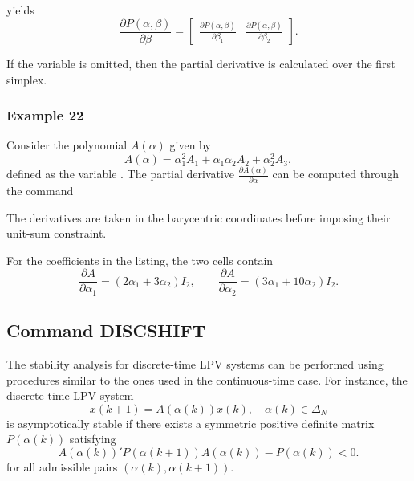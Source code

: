\documentclass[english,11pt]{article}
\theoremstyle{break} \theorembodyfont{\small\rm}
\begin{document}
\noindent yields
\[
 \frac{\partial P(\alpha,\beta)}{\partial \beta} =
 \begin{bmatrix}
    \displaystyle \frac{\partial P(\alpha,\beta)}{\partial \beta_1} & \displaystyle \frac{\partial P(\alpha,\beta)}{\partial \beta_2}
 \end{bmatrix}.
\]

If the variable  is omitted, then the partial derivative is calculated over the first simplex.


\subsubsection*{Example 22}

Consider the polynomial $A(\alpha)$ given by
\[
 A(\alpha) = \alpha_1^2A_1 + \alpha_1\alpha_2A_2 + \alpha_2^2A_3,
\]
defined as the variable .
The partial derivative $\displaystyle\frac{\partial A(\alpha)}{\partial \alpha}$ can be computed through the command
\vspace{0.5cm}%
\noindent\begin{minipage}{\linewidth}
\end{minipage}

The derivatives are taken in the barycentric coordinates before imposing
their unit-sum constraint.

For the coefficients in the listing, the two cells contain
\[
 \frac{\partial A}{\partial\alpha_1}=(2\alpha_1+3\alpha_2)I_2,\qquad
 \frac{\partial A}{\partial\alpha_2}=(3\alpha_1+10\alpha_2)I_2.
\]


\subsection*{Command DISCSHIFT}

The stability analysis for discrete-time LPV systems can be performed using procedures similar to the ones used in the
continuous-time case. For instance, the discrete-time LPV system
\[
 x(k+1) = A(\alpha(k))x(k), \quad \alpha(k) \in \Delta_N
\]
is asymptotically stable if there exists a symmetric positive definite
matrix $P(\alpha(k))$ satisfying
\[
 A(\alpha(k))'P(\alpha(k+1))A(\alpha(k)) - P(\alpha(k)) < 0.
\]
for all admissible pairs $(\alpha(k),\alpha(k+1))$.
\end{document}
